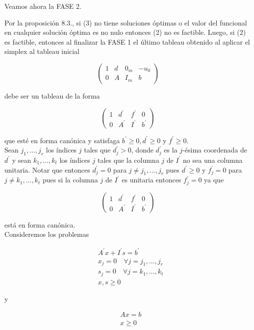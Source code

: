 \documentclass[10pt]{article}
\begin{document}
Veamos ahora la FASE 2.

Por la proposición 8.3., si (3) no tiene soluciones óptimas o el valor del funcional en cualquier solución óptima es no nulo entonces (2) no es factible. Luego, si (2) es factible, entonces al finalizar la FASE 1 el último tableau obtenido al aplicar el simplex al tableau inicial

$$
\left(\begin{array}{ccc|c}
1 & d & 0_{m} & -u_{0} \\
0 & A & I_{m} & b
\end{array}\right)
$$

debe ser un tableau de la forma

$$
\left(\begin{array}{ccc|c}
1 & d^{\prime} & f^{\prime} & 0 \\
0 & A^{\prime} & I^{\prime} & b^{\prime}
\end{array}\right)
$$

que esté en forma canónica y satisfaga $b^{\prime} \geq 0, d^{\prime} \geq 0$ y $f^{\prime} \geq 0$.\\
Sean $j_{1}, \ldots, j_{r}$ los índices $j$ tales que $d_{j}^{\prime}>0$, donde $d_{j}^{\prime}$ es la $j$-ésima coordenada de $d^{\prime}$ y sean $k_{1}, \ldots, k_{t}$ los índices $j$ tales que la columna $j$ de $I^{\prime}$ no sea una columna unitaria. Notar que entonces $d_{j}^{\prime}=0$ para $j \neq j_{1}, \ldots, j_{r}$ pues $d^{\prime} \geq 0$ y $f_{j}^{\prime}=0$ para $j \neq k_{1}, \ldots, k_{t}$ pues si la columna $j$ de $I^{\prime}$ es unitaria entonces $f_{j}^{\prime}=0$ ya que

$$
\left(\begin{array}{ccc|c}
1 & d^{\prime} & f^{\prime} & 0 \\
0 & A^{\prime} & I^{\prime} & b^{\prime}
\end{array}\right)
$$

está en forma canónica.\\
Consideremos los problemas


\begin{align*}
& A^{\prime} x+I^{\prime} s=b^{\prime} \\
& x_{j}=0 \quad \forall j=j_{1}, \ldots, j_{r}  \tag{4}\\
& s_{j}=0 \quad \forall j=k_{1}, \ldots, k_{t} \\
& x, s \geq 0
\end{align*}


y


\begin{align*}
& A x=b  \tag{5}\\
& x \geq 0
\end{align*}
\end{document}
